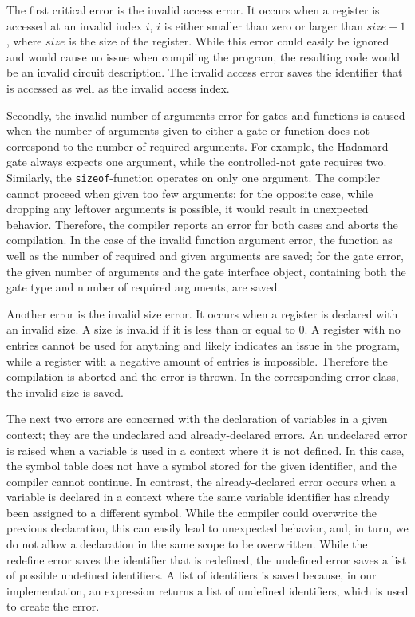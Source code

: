 The first critical error is the invalid access error. It occurs when a register is accessed at an invalid index $i$, \ie $i$ is either smaller than zero or larger than $size - 1$, where $size$ is the size of the register. While this error could easily be ignored and would cause no issue when compiling the program, the resulting code would be an invalid circuit description. The invalid access error saves the identifier that is accessed as well as the invalid access index.

Secondly, the invalid number of arguments error for gates and functions is caused when the number of arguments given to either a gate or function does not correspond to the number of required arguments. For example, the Hadamard gate always expects one argument, while the controlled-not gate requires two. Similarly, the \texttt{sizeof}-function operates on only one argument. The compiler cannot proceed when given too few arguments; for the opposite case, while dropping any leftover arguments is possible, it would result in unexpected behavior.
Therefore, the compiler reports an error for both cases and aborts the compilation. In the case of the invalid function argument error, the function as well as the number of required and given arguments are saved; for the gate error, the given number of arguments and the gate interface object, containing both the gate type and number of required arguments, are saved.

Another error is the invalid size error. It occurs when a register is declared with an invalid size. A size is invalid if it is less than or equal to $0$. A register with no entries cannot be used for anything and likely indicates an issue in the program, while a register with a negative amount of entries is impossible. Therefore the compilation is aborted and the error is thrown. In the corresponding error class, the invalid size is saved.

The next two errors are concerned with the declaration of variables in a given context; they are the undeclared and already-declared errors. An undeclared error is raised when a variable is used in a context where it is not defined. In this case, the symbol table does not have a symbol stored for the given identifier, and the compiler cannot continue. In contrast, the already-declared error occurs when a variable is declared in a context where the same variable identifier has already been assigned to a different symbol. While the compiler could overwrite the previous declaration, this can easily lead to unexpected behavior, and, in turn, we do not allow a declaration in the same scope to be overwritten. While the redefine error saves the identifier that is redefined, the undefined error saves a list of possible undefined identifiers. A list of identifiers is saved because, in our implementation, an expression returns a list of undefined identifiers, which is used to create the error.

